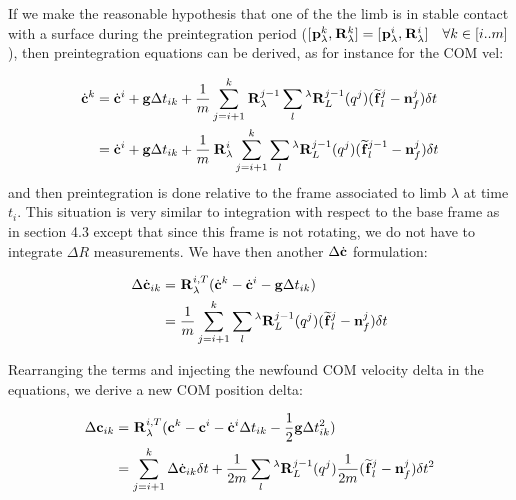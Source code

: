 \documentclass[11pt]{article}
\newcommand{\Rot}[2]{\prescript{#1}{}{\bfR}_{#2}}
\newcommand{\noise}{\bfn}
\newcommand{\posi}[2]{\prescript{#1}{}{\bfp}_{#2}}
\newcommand{\forcem}[2]{\prescript{#1}{}{\widetilde{\bff}}_{#2}}
\newcommand{\COM}{\bfc}
\newcommand{\COMd}{\dot{\bfc}}
\begin{document}
If we make the reasonable hypothesis that one of the the limb is in stable contact with a surface during the preintegration period ($[\posi{}{\lambda}^k, \Rot{}{\lambda}^k ] = [\posi{}{\lambda}^i, \Rot{}{\lambda}^i ] \quad \forall k \in [i..m]$), then preintegration equations can be derived, as for instance for the COM vel:

\begin{equation}
	\begin{split}
	\COMd^{k} &= \COMd^{i} + \bfg \Delta t_{ik} + \frac{1}{m} \sum_{j=i+1}^{k} \Rot{}{\lambda}^{j-1} \sum_l \Rot{\lambda}{L}^{j-1}(q^j) (\forcem{}{l}^{j} - \noise_f^{j}) \delta t
	\\
	&= \COMd^{i} + \bfg \Delta t_{ik} + \frac{1}{m} \Rot{}{\lambda}^{i} \sum_{j=i+1}^{k} \sum_l \Rot{\lambda}{L}^{j-1}(q^j) (\forcem{}{l}^{j-1} - \noise_f^{j}) \delta t
	\end{split}
\end{equation}
and then preintegration is done relative to the frame associated to limb $\lambda$ at time $t_i$. This situation is very similar to integration with respect to the base frame as in section 4.3 except that since this frame is not rotating, we do not have to integrate $\Delta R$ measurements. We have then another $\Delta \COMd$ formulation:

\begin{equation}
	\begin{split}
	\Delta \COMd_{ik} &= \Rot{}{\lambda}^{i,T}(\COMd^{k} - \COMd^{i} - \bfg \Delta t_{ik})
	\\
	&= \frac{1}{m} \sum_{j=i+1}^{k} \sum_l \Rot{\lambda}{L}^{j-1}(q^j) (\forcem{}{l}^{j} - \noise_f^{j}) \delta t
	\end{split}
\end{equation}

Rearranging the terms and injecting the newfound COM velocity delta in the equations, we derive a new COM position delta:


\begin{equation}
\begin{split}
\Delta \COM_{ik} &= \Rot{}{\lambda}^{i,T}(\COM^{k} - \COM^{i} - \COMd^{i}\Delta t_{ik} - \frac{1}{2} \bfg \Delta t_{ik}^2)
\\
&=  \sum_{j=i+1}^{k} \Delta \COMd_{ik} \delta t + \frac{1}{2m}\sum_l \Rot{\lambda}{L}^{j-1}(q^j) \frac{1}{2m}(\forcem{}{l}^{j} - \noise_f^{j}) \delta t^2
\end{split}
\end{equation}
\end{document}
